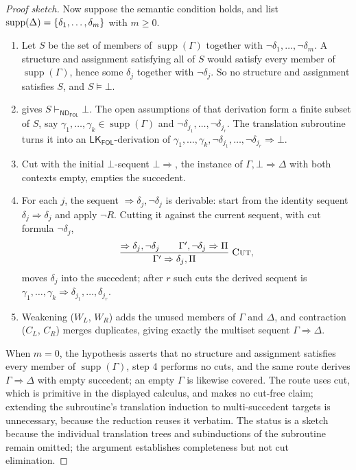 \documentclass[11pt,oneside,openany]{book}
\theoremstyle{definition}
\theoremstyle{plain}
\theoremstyle{remark}
\DeclarePairedDelimiter{\set}{\lbrace}{\rbrace}
\newcommand{\entails}{\models}
\newcommand{\derives}{\vdash}
\newcommand{\bottom}{\bot}
\newcommand{\ND}{\mathsf{ND}}
\newcommand{\LK}{\mathsf{LK}}
\newcommand{\FOL}{\mathsf{FOL}}
\newcommand{\Rule}[3][]{\frac{#2}{#3}\;\textsc{#1}}
\begin{document}
\begin{proof}[Proof sketch]
Now suppose the semantic condition holds, and list
\(\operatorname{supp}(\Delta)=\set{\delta_1,\ldots,\delta_m}\) with
\(m\geq0\).
\begin{enumerate}
  \item Let \(S\) be the set of members of
        \(\operatorname{supp}(\Gamma)\) together with
        \(\neg\delta_1,\ldots,\neg\delta_m\).  A structure and
        assignment satisfying all of \(S\) would satisfy every member
        of \(\operatorname{supp}(\Gamma)\), hence some \(\delta_j\)
        together with \(\neg\delta_j\).  So no structure and
        assignment satisfies \(S\), and \(S\entails\bottom\).
  \item {} gives
        \(S\derives_{\ND_{\FOL}}\bottom\).  The open assumptions of
        that derivation form a finite subset of \(S\), say
        \(\gamma_1,\ldots,\gamma_k\in\operatorname{supp}(\Gamma)\) and
        \(\neg\delta_{j_1},\ldots,\neg\delta_{j_r}\).  The translation
        subroutine turns it into an \(\LK_{\FOL}\)-derivation of
        \(\gamma_1,\ldots,\gamma_k,
        \neg\delta_{j_1},\ldots,\neg\delta_{j_r}\Rightarrow\bottom\).
  \item Cut with the initial \(\bottom\)-sequent
        \(\bottom\Rightarrow\), the instance of
        \(\Gamma,\bottom\Rightarrow\Delta\) with both contexts empty,
        empties the succedent.
  \item For each \(j\), the sequent
        \(\Rightarrow\delta_j,\neg\delta_j\) is derivable: start from
        the identity sequent \(\delta_j\Rightarrow\delta_j\) and apply
        \(\neg R\).  Cutting it against the current sequent, with cut
        formula \(\neg\delta_j\),
        \[
         \Rule[Cut]{\Rightarrow\delta_j,\neg\delta_j\qquad
          \Gamma',\neg\delta_j\Rightarrow\Pi}
          {\Gamma'\Rightarrow\delta_j,\Pi},
        \]
        moves \(\delta_j\) into the succedent; after \(r\) such cuts
        the derived sequent is
        \(\gamma_1,\ldots,\gamma_k\Rightarrow
        \delta_{j_1},\ldots,\delta_{j_r}\).
  \item Weakening (\(W_L\), \(W_R\)) adds the unused members of
        \(\Gamma\) and \(\Delta\), and contraction (\(C_L\),
        \(C_R\)) merges duplicates, giving exactly the multiset
        sequent \(\Gamma\Rightarrow\Delta\).
\end{enumerate}
When \(m=0\), the hypothesis asserts that no structure and assignment
satisfies every member of \(\operatorname{supp}(\Gamma)\), step 4
performs no cuts, and the same route derives
\(\Gamma\Rightarrow\Delta\) with empty succedent; an empty \(\Gamma\) is
likewise covered.  The route uses cut, which is primitive in the
displayed calculus, and makes no cut-free claim; extending the
subroutine's translation induction to multi-succedent targets is
unnecessary, because the reduction reuses it verbatim.  The status is a
sketch because the individual translation trees and subinductions of the
subroutine remain omitted; the argument establishes completeness but not
cut elimination.
\end{proof}
\end{document}
